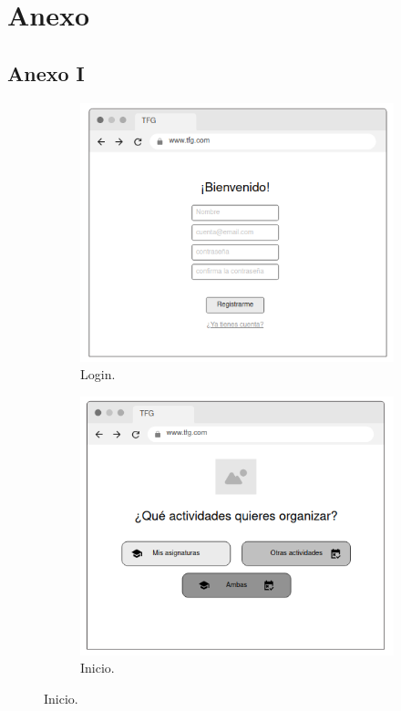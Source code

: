 
\chapter*{Anexo}

\section*{Anexo I}
\begin{figure}[!tb]
    \centering
    \begin{subfigure}[b]{0.35\textwidth}
        \includegraphics[width=\textwidth]{./imagenes/Mockup_login.png}
        \caption{Login.}
    \end{subfigure}
    \hfill
    \begin{subfigure}[b]{0.35\textwidth}
        \includegraphics[width=\textwidth]{./imagenes/Mockup_inicio.png}
        \caption{Inicio.}
    \end{subfigure}
    

\end{figure}
